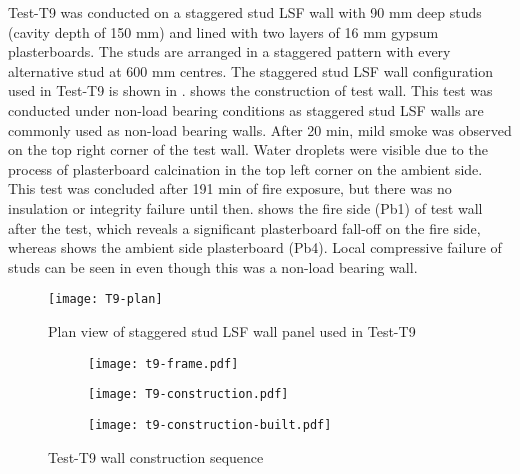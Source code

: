 Test-T9 was conducted on a staggered stud LSF wall with 90 mm deep studs (cavity depth of 150 mm) and lined with two layers of 16 mm gypsum plasterboards. The studs are arranged in a staggered pattern with every alternative stud at 600 mm centres. The staggered stud LSF wall configuration used in Test-T9 is shown in .  shows the construction of test wall. This test was conducted under non-load bearing conditions as staggered stud LSF walls are commonly used as non-load bearing walls. After 20 min, mild smoke was observed on the top right corner of the test wall. Water droplets were visible due to the process of plasterboard calcination in the top left corner on the ambient side. This test was concluded after 191 min of fire exposure, but there was no insulation or integrity failure until then.  shows the fire side (Pb1) of test wall after the test, which reveals a significant plasterboard fall-off on the fire side, whereas  shows the ambient side plasterboard (Pb4). Local compressive failure of studs can be seen in  even though this was a non-load bearing wall.   
\begin{figure}[!htbp]
	\centering
		\texttt{[image: T9-plan]}
		\caption{Plan view of staggered stud LSF wall panel used in Test-T9}
		\label{fig:T9-plan}
\end{figure}
\begin{figure}[!htbp]
	\centering
	\begin{subfigure}[b]{0.45\textwidth}
		\centering
		\texttt{[image: t9-frame.pdf]}
		\caption{}
		\label{subfig:t9-frame}
	\end{subfigure}
	\begin{subfigure}[b]{0.45\textwidth}
		\centering
		\texttt{[image: T9-construction.pdf]}
		\caption{}
		\label{subfig:T9-construction}
	\end{subfigure}
	\begin{subfigure}[b]{0.45\textwidth}
		\centering
		\texttt{[image: t9-construction-built.pdf]}
		\caption{}
		\label{subfig:t9-construction-built}
	\end{subfigure}
	   \caption{Test-T9 wall construction sequence}
	   \label{fig:t9-construction-sequence}
\end{figure}
